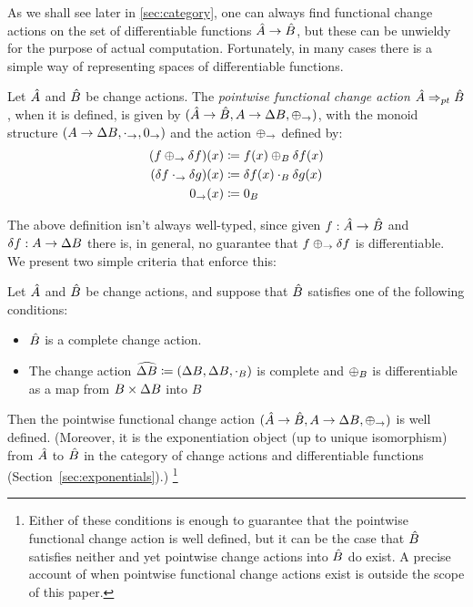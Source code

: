 As we shall see later in \cref{sec:category}, one can always find functional change actions on the set
of differentiable functions $\hat{A} \rightarrow \hat{B}$, but these can be unwieldy for 
the purpose of actual computation. Fortunately, in many cases there is a simple
way of representing spaces of differentiable functions.

\begin{defn}
  Let $\hat{A}$ and $\hat{B}$ be change actions. The \emph{pointwise functional change action} 
  $\hat{A} \Rightarrow_{pt} \hat{B}$, when it is defined,
  is given by $(\hat{A} \rightarrow \hat{B}, A \rightarrow \Delta B, \oplus_\rightarrow)$, with
  the monoid structure $(A \rightarrow \Delta B, \cdot_\rightarrow, 0_\rightarrow)$ and the action 
  $\oplus_\rightarrow$ defined by:
  \begin{align*}
    (f \oplus_\to \delta f)(x) &\coloneqq f(x) \oplus_B \delta f (x)\\
    (\delta f \cdot_\rightarrow \delta g)(x) &\coloneqq \delta f(x) \cdot_B \delta g(x)\\
    0_\rightarrow (x) &\coloneqq 0_B
  \end{align*}
\end{defn}

The above definition isn't always well-typed, since given $f : \hat{A} \rightarrow \hat{B}$ and
$\delta f : A \rightarrow \Delta B$ there is, in general, no guarantee that 
$f \oplus_\rightarrow \delta f$ is differentiable. We present two simple criteria that enforce this:

\begin{thm}
  Let $\hat{A}$ and $\hat{B}$ be change actions, and suppose that $\hat{B}$ satisfies one of the
  following conditions:
  \begin{itemize}
    \item $\hat{B}$ is a complete change action.
    \item The change action $\widehat {\Delta B} \coloneqq (\Delta B, \Delta B, \cdot_B)$ is 
      complete and 
      $\oplus_B$ is differentiable as a map from $B \times \Delta B$ into $B$
  \end{itemize}
  Then the pointwise functional change action 
  $(\hat{A} \rightarrow \hat{B}, A \rightarrow \Delta B, \oplus_\rightarrow)$ is well defined. 
  (Moreover, it is the exponentiation object (up to unique isomorphism) from $\hat{A}$ to $\hat{B}$ in the category of change actions and differentiable functions (Section~\ref{sec:exponentials}).)
  \footnote{
    Either of these conditions is enough to guarantee that the pointwise functional change action
    is well defined, but it can be the case that $\hat{B}$ satisfies neither and yet pointwise
    change actions into $\hat{B}$ do exist. A precise account of when pointwise functional change
    actions exist is outside the scope of this paper.
  }
\end{thm}

